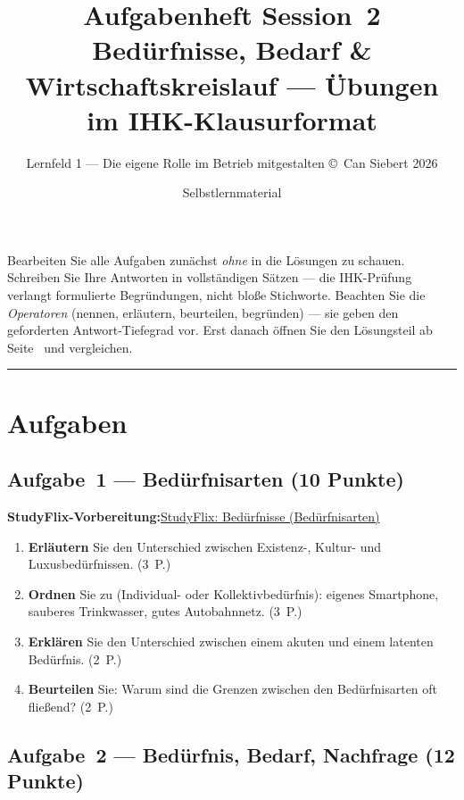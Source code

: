\documentclass[11pt, a4paper]{article}
\title{\vspace*{-1.5cm}\Huge\bfseries\color{bfwPrimaryDark}Aufgabenheft Session~2\\[0.4em]
  \large\color{bfwInkSoft}\textnormal{Bedürfnisse, Bedarf \& Wirtschaftskreislauf --- Übungen im IHK-Klausurformat}}
\author{\textsf{Lernfeld 1 --- Die eigene Rolle im Betrieb mitgestalten \textperiodcentered{} \small\copyright\ Can Siebert\,\textperiodcentered\,2026}}
\date{Selbstlernmaterial}
\begin{document}
\maketitle
\thispagestyle{empty}

\begin{merksatz}[title={\bfseries So nutzen Sie dieses Aufgabenheft}]
Bearbeiten Sie alle Aufgaben zunächst \emph{ohne} in die Lösungen zu schauen. Schreiben
Sie Ihre Antworten in vollständigen Sätzen --- die IHK-Prüfung verlangt formulierte
Begründungen, nicht bloße Stichworte. Beachten Sie die \emph{Operatoren} (nennen,
erläutern, beurteilen, begründen) --- sie geben den geforderten Antwort-Tiefegrad vor.
Erst danach öffnen Sie den Lösungsteil ab Seite~\pageref{loesungen} und vergleichen.
\end{merksatz}

\tableofcontents
\vspace{1em}
\hrule

\section{Aufgaben}

\subsection*{Aufgabe~1 --- Bedürfnisarten (10 Punkte)}

\noindent\textbf{\color{bfwAccent}StudyFlix-Vorbereitung:}\enspace \href{https://studyflix.de/wirtschaft/bedurfnisse-6034}{StudyFlix: Bedürfnisse (Bedürfnisarten)}

\medskip
\begin{enumerate}[label=(\alph*)]
  \item \textbf{Erläutern} Sie den Unterschied zwischen Existenz-, Kultur- und Luxusbedürfnissen. \hfill (3~P.)
  \item \textbf{Ordnen} Sie zu (Individual- oder Kollektivbedürfnis): eigenes Smartphone, sauberes Trinkwasser, gutes Autobahnnetz. \hfill (3~P.)
  \item \textbf{Erklären} Sie den Unterschied zwischen einem akuten und einem latenten Bedürfnis. \hfill (2~P.)
  \item \textbf{Beurteilen} Sie: Warum sind die Grenzen zwischen den Bedürfnisarten oft fließend? \hfill (2~P.)
\end{enumerate}

\subsection*{Aufgabe~2 --- Bedürfnis, Bedarf, Nachfrage (12 Punkte)}
\end{document}
